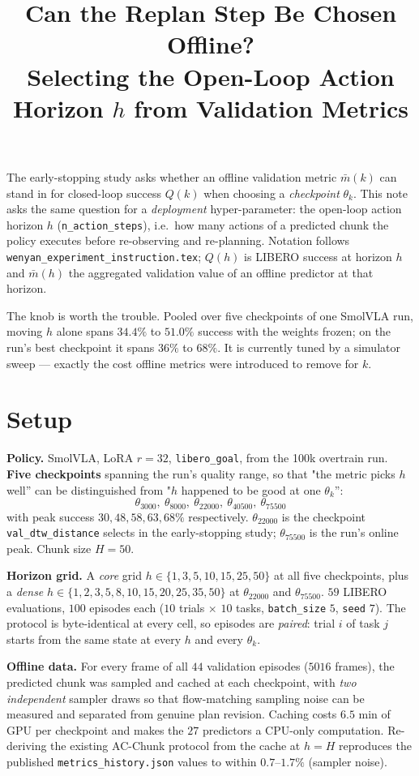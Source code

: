 \documentclass[11pt]{article}
\title{Can the Replan Step Be Chosen Offline?\\
Selecting the Open-Loop Action Horizon $h$ from Validation Metrics}
\author{}
\date{}
\begin{document}
\maketitle

The early-stopping study asks whether an offline validation metric $\bar m(k)$ can stand in for
closed-loop success $Q(k)$ when choosing a \emph{checkpoint} $\theta_k$. This note asks the same
question for a \emph{deployment} hyper-parameter: the open-loop action horizon $h$
(\texttt{n\_action\_steps}), i.e.\ how many actions of a predicted chunk the policy executes before
re-observing and re-planning. Notation follows \texttt{wenyan\_experiment\_instruction.tex}; $Q(h)$
is LIBERO success at horizon $h$ and $\bar m(h)$ the aggregated validation value of an offline
predictor at that horizon.

The knob is worth the trouble. Pooled over five checkpoints of one SmolVLA run, moving $h$ alone
spans $34.4\%$ to $51.0\%$ success with the weights frozen; on the run's best checkpoint it spans
$36\%$ to $68\%$. It is currently tuned by a simulator sweep --- exactly the cost offline metrics
were introduced to remove for $k$.

\section{Setup}

\textbf{Policy.} SmolVLA, LoRA $r{=}32$, \texttt{libero\_goal}, from the 100k overtrain run.
\textbf{Five checkpoints} spanning the run's quality range, so that "the metric picks $h$ well'' can
be distinguished from "$h$ happened to be good at one $\theta_k$'':
\[
\theta_{3000},\ \theta_{8000},\ \theta_{22000},\ \theta_{40500},\ \theta_{75500}
\]
with peak success $30, 48, 58, 63, 68\%$ respectively. $\theta_{22000}$ is the checkpoint
\texttt{val\_dtw\_distance} selects in the early-stopping study; $\theta_{75500}$ is the run's online
peak. Chunk size $H=50$.

\textbf{Horizon grid.} A \emph{core} grid $h\in\{1,3,5,10,15,25,50\}$ at all five checkpoints, plus a
\emph{dense} $h\in\{1,2,3,5,8,10,15,20,25,35,50\}$ at $\theta_{22000}$ and $\theta_{75500}$.
$59$ LIBERO evaluations, $100$ episodes each ($10$ trials $\times$ $10$ tasks, \texttt{batch\_size}
$5$, \texttt{seed} $7$). The protocol is byte-identical at every cell, so episodes are \emph{paired}:
trial $i$ of task $j$ starts from the same state at every $h$ and every $\theta_k$.

\textbf{Offline data.} For every frame of all $44$ validation episodes ($5016$ frames), the predicted
chunk was sampled and cached at each checkpoint, with \emph{two independent} sampler draws so that
flow-matching sampling noise can be measured and separated from genuine plan revision. Caching costs
$6.5$ min of GPU per checkpoint and makes the $27$ predictors a CPU-only computation. Re-deriving the
existing AC-Chunk protocol from the cache at $h=H$ reproduces the published
\texttt{metrics\_history.json} values to within $0.7$--$1.7\%$ (sampler noise).
\end{document}
